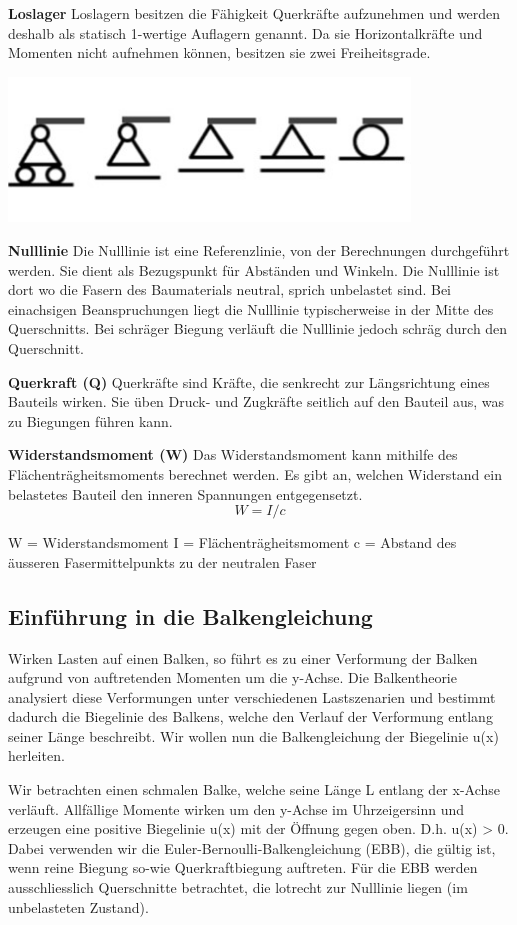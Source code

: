 \textbf{Loslager}
Loslagern besitzen die Fähigkeit Querkräfte aufzunehmen und werden deshalb als statisch 1-wertige Auflagern genannt.
Da sie Horizontalkräfte und Momenten nicht aufnehmen können, besitzen sie zwei Freiheitsgrade.
\begin{center}
	\includegraphics[width=0.8\textwidth]{papers/balken/images/teil1/Loslager.jpg}
\end{center}
\label{Festlagern werden typischerweise mit den folgenden Symbolen dargestellt.}

\textbf{Nulllinie}
Die Nulllinie ist eine Referenzlinie, von der Berechnungen durchgeführt werden. Sie dient als Bezugspunkt für Abständen und Winkeln.
Die Nulllinie ist dort wo die Fasern des Baumaterials neutral, sprich unbelastet sind.
Bei einachsigen Beanspruchungen liegt die Nulllinie typischerweise in der Mitte des Querschnitts.
Bei schräger Biegung verläuft die Nulllinie jedoch schräg durch den Querschnitt.

\textbf{Querkraft (Q)}
Querkräfte sind Kräfte, die senkrecht zur Längsrichtung eines Bauteils wirken.
Sie üben Druck- und Zugkräfte seitlich auf den Bauteil aus, was zu Biegungen führen kann.

\textbf{Widerstandsmoment (W)}
Das Widerstandsmoment kann mithilfe des Flächenträgheitsmoments berechnet werden.
Es gibt an, welchen Widerstand ein belastetes Bauteil den inneren Spannungen entgegensetzt.
\begin{equation}
	W=
	I/c
\end{equation}
\label{Formel für den Widerstandsmoment.}

W = Widerstandsmoment
I = Flächenträgheitsmoment
c = Abstand des äusseren Fasermittelpunkts zu der neutralen Faser

\subsection{Einführung in die Balkengleichung}
Wirken Lasten auf einen Balken, so führt es zu einer Verformung der Balken aufgrund von auftretenden Momenten um die y-Achse.
Die Balkentheorie analysiert diese Verformungen unter verschiedenen Lastszenarien und bestimmt dadurch die Biegelinie des Balkens, welche den Verlauf der Verformung entlang seiner Länge beschreibt.
Wir wollen nun die Balkengleichung der Biegelinie u(x) herleiten.

Wir betrachten einen schmalen Balke, welche seine Länge L entlang der x-Achse verläuft.
Allfällige Momente wirken um den y-Achse im Uhrzeigersinn und erzeugen eine positive Biegelinie u(x) mit der Öffnung gegen oben.
D.h. u(x) > 0.
Dabei verwenden wir die Euler-Bernoulli-Balkengleichung (EBB), die gültig ist, wenn reine Biegung so-wie Querkraftbiegung auftreten.
Für die EBB werden ausschliesslich Querschnitte betrachtet, die lotrecht zur Nulllinie liegen (im unbelasteten Zustand).